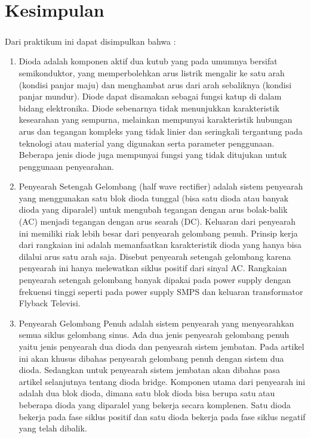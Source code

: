 \documentclass[12pt,a4paper]{article}
\begin{document}
\section{Kesimpulan}
\subparagraph{ }
Dari praktikum ini dapat disimpulkan bahwa :
\begin{enumerate}

\item Dioda adalah komponen aktif dua kutub yang pada umumnya bersifat semikonduktor, yang memperbolehkan arus listrik mengalir ke satu arah (kondisi panjar maju) dan menghambat arus dari arah sebaliknya (kondisi panjar mundur). Diode dapat disamakan sebagai fungsi katup di dalam bidang elektronika. Diode sebenarnya tidak menunjukkan karakteristik kesearahan yang sempurna, melainkan mempunyai karakteristik hubungan arus dan tegangan kompleks yang tidak linier dan seringkali tergantung pada teknologi atau material yang digunakan serta parameter penggunaan. Beberapa jenis diode juga mempunyai fungsi yang tidak ditujukan untuk penggunaan penyearahan.

\item Penyearah Setengah Gelombang (half wave rectifier) adalah sistem penyearah yang menggunakan satu blok dioda tunggal (bisa satu dioda atau banyak dioda yang diparalel) untuk mengubah tegangan dengan arus bolak-balik (AC) menjadi tegangan dengan arus searah (DC). Keluaran dari penyearah ini memiliki riak lebih besar dari penyearah gelombang penuh. Prinsip kerja dari rangkaian ini adalah  memanfaatkan karakteristik dioda yang hanya bisa dilalui arus satu arah saja. Disebut penyearah setengah gelombang karena penyearah ini hanya melewatkan siklus positif dari sinyal AC. Rangkaian penyearah setengah gelombang banyak dipakai pada power supply dengan frekuensi tinggi seperti pada power supply SMPS dan keluaran transformator Flyback Televisi.

\item Penyearah Gelombang Penuh adalah sistem penyearah yang menyearahkan semua siklus gelombang sinus. Ada dua jenis penyearah gelombang penuh yaitu jenis penyearah dua dioda dan penyearah sistem jembatan. Pada artikel ini akan khusus dibahas penyearah gelombang penuh dengan sistem dua dioda. Sedangkan untuk penyearah sistem jembatan akan dibahas pasa artikel selanjutnya tentang dioda bridge. Komponen utama dari penyearah ini adalah dua blok dioda, dimana satu blok dioda bisa berupa satu atau beberapa dioda yang diparalel yang bekerja secara komplenen. Satu dioda bekerja pada fase siklus positif dan satu dioda bekerja pada fase siklus negatif yang telah dibalik.

\end{enumerate}
\end{document}
